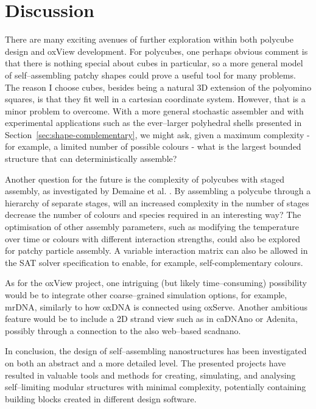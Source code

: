 \chapter{Discussion}
\label{ch:conclusion}

There are many exciting avenues of further exploration within both polycube design and oxView development. For polycubes, one perhaps obvious comment is that there is nothing special about cubes in particular, so a more general model of self--assembling patchy shapes could prove a useful tool for many problems. The reason I choose cubes, besides being a natural 3D extension of the polyomino squares, is that they fit well in a cartesian coordinate system. However, that is a minor problem to overcome. With a more general stochastic assembler and with experimental applications such as the ever--larger polyhedral shells presented in Section~\ref{sec:shape-complementary}, we might ask, given a maximum complexity - for example, a limited number of possible colours - what is the largest bounded structure that can deterministically assemble?

Another question for the future is the complexity of polycubes with staged assembly, as investigated by Demaine et al. \cite{demaine2008staged}. By assembling a polycube through a hierarchy of separate stages, will an increased complexity in the number of stages decrease the number of colours and species required in an interesting way? The optimisation of other assembly parameters, such as modifying the temperature over time or colours with different interaction strengths, could also be explored for patchy particle assembly. A variable interaction matrix can also be allowed in the SAT solver specification to enable, for example, self-complementary colours.

As for the oxView project, one intriguing (but likely time--consuming) possibility would be to integrate other coarse--grained simulation options, for example, mrDNA, similarly to how oxDNA is connected using oxServe. Another ambitious feature would be to include a 2D strand view such as in caDNAno or Adenita, possibly through a connection to the also web--based scadnano.

In conclusion, the design of self--assembling nanostructures has been investigated on both an abstract and a more detailed level. The presented projects have resulted in valuable tools and methods for creating, simulating, and analysing self--limiting modular structures with minimal complexity, potentially containing building blocks created in different design software.